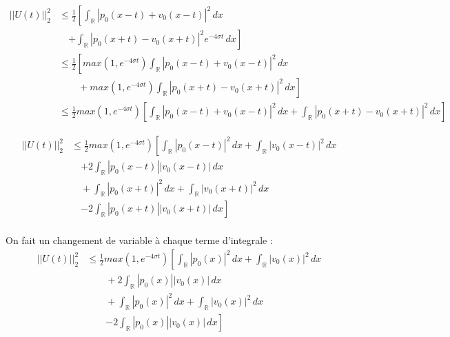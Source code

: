 \documentclass[a4paper,11pt]{article}
\begin{document}
\begin{equation*}
\begin{split}
    ||U(t)||^{2}_{2} & \le \frac{1}{2} \left[ \int_{\mathbb{R}}|p_0(x-t) + v_0(x-t)|^{2} \,dx \right. \\
   & \quad \left. + \int_{\mathbb{R}} |p_0(x+t) - v_0(x+t)|^{2}  e^{-4\sigma t} \,dx \right] \\
   & \le \frac{1}{2} \left[ max(1, e^{-4\sigma t}) 
   \int_{\mathbb{R}} |p_0(x-t) + v_0(x-t)|^{2} \,dx \right. \\
   & \left. \qquad + max(1, e^{-4\sigma t}) 
   \int_{\mathbb{R}} |p_0(x+t) - v_0(x+t)|^{2} \,dx \right] \\
   & \le \frac{1}{2} max(1, e^{-4\sigma t}) \left[ \int_{\mathbb{R}} |p_0(x-t) + v_0(x-t)|^{2} \,dx + \int_{\mathbb{R}} |p_0(x+t) - v_0(x+t)|^{2} \,dx \right]
\end{split}
\end{equation*}

\begin{equation*}
\begin{split}
    ||U(t)||^{2}_{2} & \le \frac{1}{2} max(1, e^{-4\sigma t}) \left[ \int_{\mathbb{R}}|p_0(x-t)|^{2} \,dx + \int_{\mathbb{R}} |v_0(x-t)|^{2} \,dx \right. \\
   & \quad \left. + 2 \int_{\mathbb{R}} |p_0(x-t)| |v_0(x-t)| \,dx \right. \\
   & \quad + \left. \int_{\mathbb{R}}|p_0(x+t)|^{2} \,dx + \int_{\mathbb{R}} |v_0(x+t)|^{2} \,dx \right. \\
   & \quad \left. - 2 \int_{\mathbb{R}} |p_0(x+t)| |v_0(x+t)| \,dx \right] \\
\end{split}
\end{equation*}

On fait un changement de variable à chaque terme d'integrale :
\begin{equation*}
\begin{split}
    ||U(t)||^{2}_{2} & \le \frac{1}{2} max(1, e^{-4\sigma t}) \left[ \int_{\mathbb{R}}|p_0(x)|^{2} \,dx + \int_{\mathbb{R}} |v_0(x)|^{2} \,dx \right. \\
   & \left. \qquad  + 2 \int_{\mathbb{R}} |p_0(x)| |v_0(x)| \,dx \right. \\
   & \left. \qquad + \int_{\mathbb{R}}|p_0(x)|^{2} \,dx + \int_{\mathbb{R}} |v_0(x)|^{2} \,dx \right. \\
   & \qquad \left. - 2 \int_{\mathbb{R}} |p_0(x)| |v_0(x)| \,dx 
    \right]
\end{split}
\end{equation*}
\end{document}
